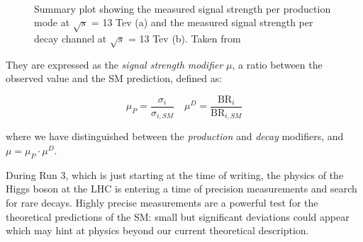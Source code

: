 \begin{figure}
    \myfloatalign
     \quad
     \\
    \caption[Signal strength modifiers]{Summary plot showing the measured signal strength per
    production mode at $\sqrt{s}$ = 13 Tev (a) and the measured signal
    strength per decay channel at $\sqrt{s}$ = 13 Tev (b). Taken from \cite{higgsrevcms}}\label{fig:sigsm}
\end{figure}

They are expressed as the \emph{signal strength modifier} $\mu$, a ratio between the observed value and  the SM prediction, defined as:

\[
\mu_P = \frac{\sigma_i}{\sigma_{i, SM}} \quad \mu^D = \frac{\text{BR}_i}{\text{BR}_{i, SM}}
\]

where we have distinguished between the \emph{production} and \emph{decay} modifiers, and $\mu = \mu_P \cdot \mu^D$.

During Run 3, which is just starting at the time of writing, the
physics of the Higgs boson at the LHC is entering a time of precision measurements and
search for rare decays. Highly precise measurements are a powerful test for the theoretical predictions of the SM: small but significant deviations could appear which may hint at physics beyond our current theoretical description.

